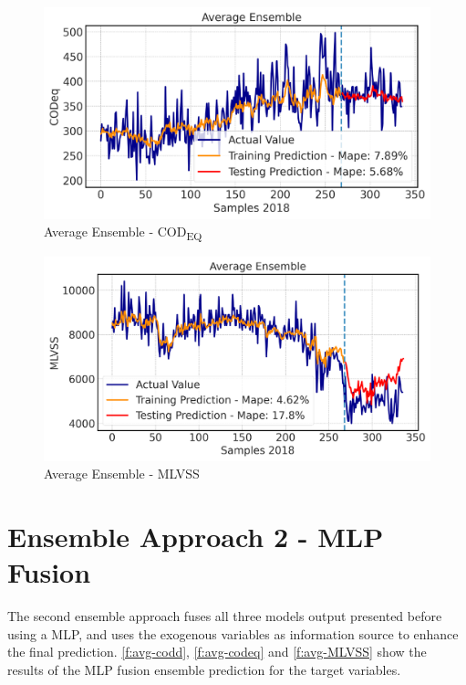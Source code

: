 \begin{figure}[h]
\centering
\includegraphics[width=\linewidth]{figures/Ch5/CODeq-avg.pdf}
\caption{Average Ensemble - COD\textsubscript{EQ}}
\label{f:avg-codeq}
\end{figure}

\begin{figure}[h]
\centering
\includegraphics[width=\linewidth]{figures/Ch5/MVLSS-E_avg.pdf}
\caption{Average Ensemble - MLVSS}
\label{f:avg-MLVSS}
\end{figure}

\section{Ensemble Approach 2 - MLP Fusion}
The second ensemble approach fuses all three models output presented before using a \ac{MLP}, and uses the exogenous variables as information source to enhance the final prediction. \autoref{f:avg-codd}, \autoref{f:avg-codeq} and \autoref{f:avg-MLVSS} show the results of the \ac{MLP} fusion ensemble prediction for the target variables. 

